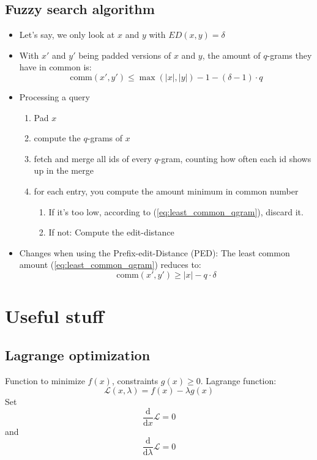 \documentclass[a4paper]{scrartcl}
\begin{document}
\subsection{Fuzzy search algorithm}
\label{sec:fuzzy_search_algorithm}
\begin{itemize}
\item Let's say, we only look at $x$ and $y$ with $ED(x,y)=\delta$
\item With $x'$ and $y'$ being padded versions of $x$ and $y$, the amount of
  $q$-grams they have in common is:
  \begin{equation}
  \mathrm{comm}(x',y')\le \max(|x|,|y|)-1-(\delta - 1)\cdot q\label{eq:least_common_qgram}
\end{equation}

\item Processing a query
  \begin{enumerate}
  \item Pad $x$
  \item compute the $q$-grams of $x$
  \item fetch and merge all ids of every $q$-gram, counting how often each id
    shows up in the merge
  \item for each entry, you compute the amount minimum in common number
    \begin{enumerate}
    \item If it's too low, according to (\ref{eq:least_common_qgram}), discard
      it.
    \item If not: Compute the edit-distance
    \end{enumerate}
    
  \end{enumerate}
\item Changes when using the Prefix-edit-Distance (PED): The least common amount
  (\ref{eq:least_common_qgram}) reduces to:
  \begin{equation}
    \label{eq:least_common_ped}
    \mathrm{comm}(x',y')\ge |x|-q\cdot \delta
  \end{equation}
\end{itemize}


\section{Useful stuff}

\subsection{Lagrange optimization}
Function to minimize $f(x)$, constraints $g(x)\ge 0$. Lagrange function:
\[\mathcal{L}(x,\lambda)=f(x)-\lambda g(x)\]
Set
\[\frac{\mathrm{d}}{\mathrm{d}x}\mathcal{L}=0\] and
\[\frac{\mathrm{d}}{\mathrm{d}\lambda}\mathcal{L}=0\]

\end{document}
